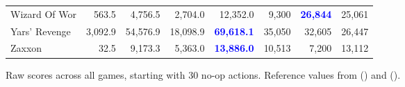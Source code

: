 \documentclass[letterpaper]{article}
\newcommand{\citet}[1]{\citeauthor{#1} (\citeyear{#1})}
\begin{document}
\begin{figure*}
\begin{tabular}{ l | r|r|r|r|r|r| r }
Wizard Of Wor & 563.5 & 4,756.5 & 2,704.0 & 12,352.0 & 9,300 & \textbf{\textcolor{blue}{26,844}} & 25,061 \\
Yars' Revenge & 3,092.9 & 54,576.9 & 18,098.9 & \textbf{\textcolor{blue}{69,618.1}} & 35,050 & 32,605 & 26,447 \\
Zaxxon & 32.5 & 9,173.3 & 5,363.0 & \textbf{\textcolor{blue}{13,886.0}} & 10,513 & 7,200 & 13,112
\end{tabular}
\caption{Raw scores across all games, starting with 30 no-op actions. Reference values from \citet{wang2016dueling} and \citet{c51}.\label{fig:atari_sota}}
\end{figure*}
\end{document}
